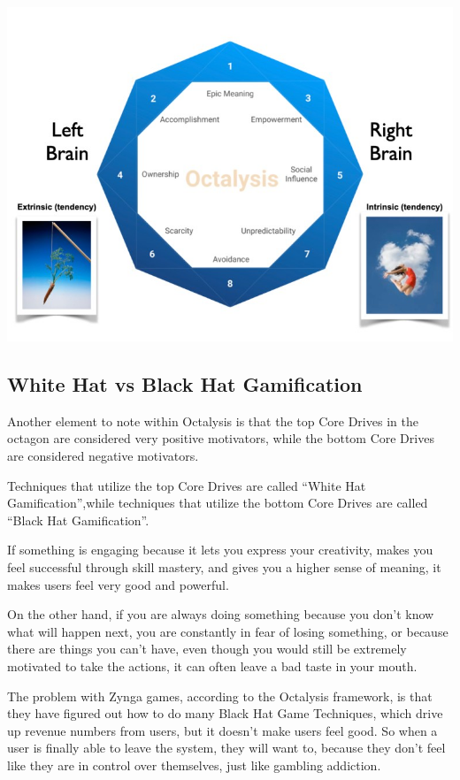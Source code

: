 \documentclass[
]{book}
\begin{document}
\begin{center}\includegraphics[width=0.75\linewidth]{assets/images/Left-Brain-vs-Right-Brain-Gamification} \end{center}

\hypertarget{white-hat-vs-black-hat-gamification}{%
\subsection{White Hat vs Black Hat Gamification}\label{white-hat-vs-black-hat-gamification}}

Another element to note within Octalysis is that the top Core Drives in the octagon are considered very positive motivators, while the bottom Core Drives are considered negative motivators.

Techniques that utilize the top Core Drives are called ``White Hat Gamification'',while techniques that utilize the bottom Core Drives are called ``Black Hat Gamification''.

If something is engaging because it lets you express your creativity, makes you feel successful through skill mastery, and gives you a higher sense of meaning, it makes users feel very good and powerful.

On the other hand, if you are always doing something because you don't know what will happen next, you are constantly in fear of losing something, or because there are things you can't have, even though you would still be extremely motivated to take the actions, it can often leave a bad taste in your mouth.

The problem with Zynga games, according to the Octalysis framework, is that they have figured out how to do many Black Hat Game Techniques, which drive up revenue numbers from users, but it doesn't make users feel good. So when a user is finally able to leave the system, they will want to, because they don't feel like they are in control over themselves, just like gambling addiction.
\end{document}
